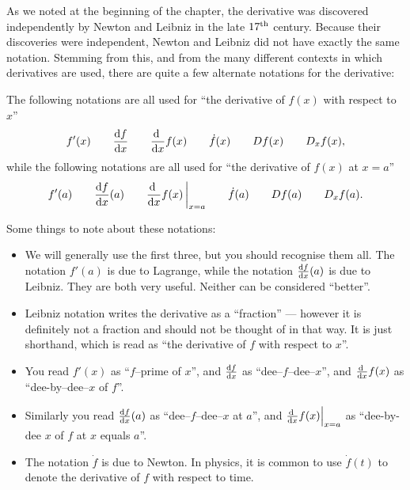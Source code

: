 As we noted at the beginning of the chapter, the derivative was discovered independently
by Newton and Leibniz in the late $17^{\rm th}$ century. Because their discoveries were
independent, Newton and Leibniz did not have exactly the same notation. Stemming from
this, and from the many different contexts in which derivatives are used, there are quite
a few alternate notations for the derivative:

\begin{notn}\label{notn higher diff}
The following notations are all used for ``the derivative of $f(x)$ with respect to $x$''
\begin{align*}
f'(x) \qquad
\diff{f}{x} \qquad
\diff{}{x}f(x) \qquad
\dot f(x) \qquad
Df(x) \qquad
D_x f(x),
\end{align*}
while the following notations are all used for ``the derivative of $f(x)$ at $x=a$''
\begin{align*}
f'(a) \qquad
\diff{f}{x}(a) \qquad
\diff{}{x}f(x)\,\bigg|_{x=a} \qquad
\dot f(a) \qquad
Df(a) \qquad
D_x f(a).
\end{align*}


Some things to note about these notations:
\begin{itemize}
 \item We will generally use the first three, but you should recognise
them all. The notation $f'(a)$ is due to Lagrange, while the notation
$\diff{f}{x}(a)$ is due to Leibniz. They are both very useful. Neither
can be considered ``better''.

\item Leibniz notation writes the derivative as a ``fraction'' --- however it
is definitely not a fraction and should not be thought of in that way. It is
just shorthand, which is read as ``the derivative of $f$ with respect to
$x$''.

\item You read $f'(x)$ as ``$f$--prime of $x$'', and $\diff{f}{x}$ as
``dee--$f$--dee--$x$'', and $\diff{ }{x}f(x)$ as ``dee-by--dee--$x$ of $f$''.

\item Similarly you read $\diff{f}{x}(a)$ as ``dee--$f$--dee--$x$ at $a$'',
and $\diff{ }{x}f(x)\Big|_{x=a}$ as ``dee-by-dee $x$ of $f$ at $x$ equals $a$''.

\item The notation $\dot f$ is due to Newton. In physics, it is common
to use $\dot f(t)$ to denote the derivative of $f$ with respect to time.
\end{itemize}

\end{notn}


